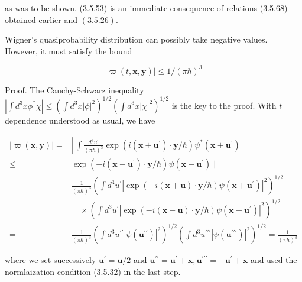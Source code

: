 \documentclass{article}
\begin{document}
as was to be shown.
(3.5.53) is an immediate consequence of relations (3.5.68) obtained earlier and $(3.5 .26)$.

Wigner's quasiprobability distribution can possibly take negative values. However, it must satisfy the bound
 
\begin{equation*}
|\varpi(t, \boldsymbol{x}, \boldsymbol{y})| \leq 1 /(\pi \hbar)^{3} \tag{3.5.76}
\end{equation*}
 

Proof. The Cauchy-Schwarz inequality $\left|\int d^{3} x \phi^{*} \chi\right| \leq\left(\int d^{3} x|\phi|^{2}\right)^{1 / 2}\left(\int d^{3} x|\chi|^{2}\right)^{1 / 2}$ is the key to the proof. With $t$ dependence understood as usual, we have
 
\begin{align*}
|\varpi(\boldsymbol{x}, \boldsymbol{y})|= & \left\lvert\, \int \frac{d^{3} u^{\prime}}{(\pi \hbar)^{3}} \exp \left(i\left(\boldsymbol{x}+\boldsymbol{u}^{\prime}\right) \cdot \boldsymbol{y} / \hbar\right) \psi^{*}\left(\boldsymbol{x}+\boldsymbol{u}^{\prime}\right)\right.  \tag{3.5.77}\\
\leq & \exp \left(-i\left(\boldsymbol{x}-\boldsymbol{u}^{\prime}\right) \cdot \boldsymbol{y} / \hbar\right) \psi\left(\boldsymbol{x}-\boldsymbol{u}^{\prime}\right) \mid \\
& \frac{1}{(\pi \hbar)^{3}}\left(\int d^{3} u^{\prime}\left|\exp (-i(\boldsymbol{x}+\boldsymbol{u}) \cdot \boldsymbol{y} / \hbar) \psi\left(\boldsymbol{x}+\boldsymbol{u}^{\prime}\right)\right|^{2}\right)^{1 / 2} \\
& \quad \times\left(\int d^{3} u^{\prime}\left|\exp (-i(\boldsymbol{x}-\boldsymbol{u}) \cdot \boldsymbol{y} / \hbar) \psi\left(\boldsymbol{x}-\boldsymbol{u}^{\prime}\right)\right|^{2}\right)^{1 / 2} \\
= & \frac{1}{(\pi \hbar)^{3}}\left(\int d^{3} u^{\prime \prime}\left|\psi\left(\boldsymbol{u}^{\prime \prime}\right)\right|^{2}\right)^{1 / 2}\left(\int d^{3} u^{\prime \prime \prime}\left|\psi\left(\boldsymbol{u}^{\prime \prime \prime}\right)\right|^{2}\right)^{1 / 2}=\frac{1}{(\pi \hbar)^{3}}
\end{align*}
 
where we set successively $\boldsymbol{u}^{\prime}=\boldsymbol{u} / 2$ and $\boldsymbol{u}^{\prime \prime}=\boldsymbol{u}^{\prime}+\boldsymbol{x}, \boldsymbol{u}^{\prime \prime \prime}=-\boldsymbol{u}^{\prime}+\boldsymbol{x}$ and used the normlaization condition (3.5.32) in the last step.
\end{document}
